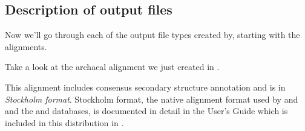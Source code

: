 \subsection{Description of output files}

Now we'll go through each of the output file types
created by, starting with the alignments.

Take a look at the archaeal alignment we just created in
. 

This alignment includes consensus secondary structure annotation and
is in \emph{Stockholm format}. 
Stockholm format, the native alignment format used by  and
 and the  and 
databases, is documented in detail in the  User's
Guide which is included in this distribution in
.

